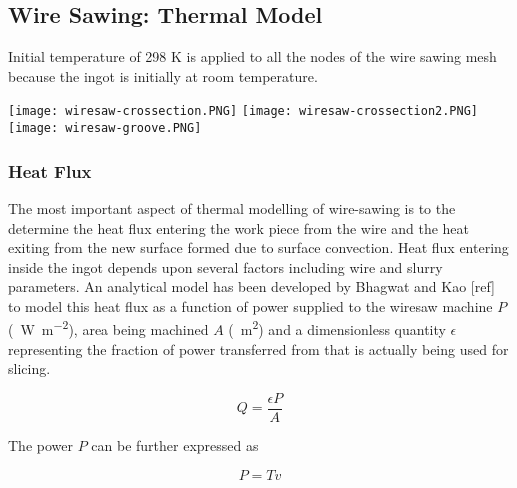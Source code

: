 \subsection{Wire Sawing: Thermal Model}

Initial temperature of 298 K is applied to all the nodes of the wire sawing mesh because the ingot is initially at room temperature. 


\noindent
\begin{minipage}[c]{\textwidth}
\centering
        \captionsetup{type=figure}
        \texttt{[image: wiresaw-crossection.PNG]}
        \texttt{[image: wiresaw-crossection2.PNG]}
        \texttt{[image: wiresaw-groove.PNG]}
        \label{fig:wiresawing-crossection}
 \end{minipage}
\subsubsection{Heat Flux}
The most important aspect of thermal modelling of wire-sawing is to the determine the heat flux entering the work piece from the wire and the heat exiting from the new surface formed due to surface convection. Heat flux entering inside the ingot depends upon several factors including wire and slurry parameters. An analytical model has been developed by Bhagwat and Kao [ref] to model this heat flux as a function of power supplied to the wiresaw machine $P$ (\SI{}{W.m^{-2}}), area being machined $A$ (\SI{}{m^{2}}) and a dimensionless quantity $\epsilon$ representing the fraction of power transferred from that is actually being used for slicing.

\begin{equation}
Q = \frac{\epsilon P}{A}
   \label {wire_eq1}
\end{equation}


The power $P$ can be further expressed as 


\begin{equation}
P = Tv
   \label {wire_eq2}
\end{equation}

